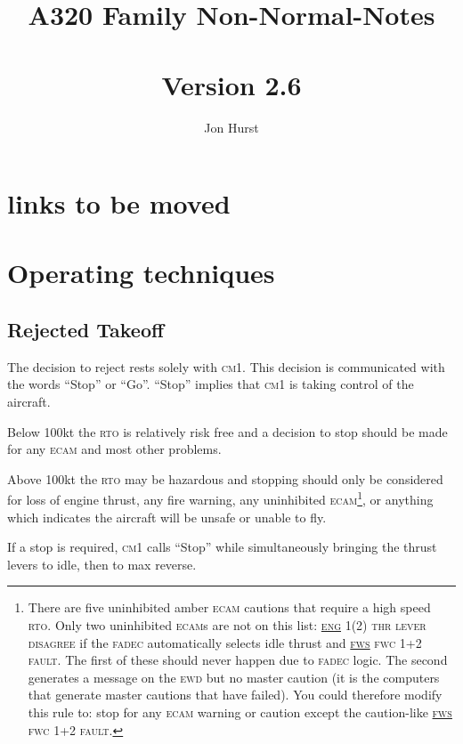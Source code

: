 \documentclass[a5paper,11pt,twoside]{book}
\title{A320 Family Non-Normal-Notes\\~\\\large{Version 2.6}}
\author{Jon Hurst}
\date{}
\newcommand{\ac}[1]{{\scshape\MakeLowercase{#1}}}
\newcommand{\ecam}[2]{{\ac{\uline{#1} #2}}}
\begin{document}
\frontmatter
\maketitle

\ifdefined\HCode
\else
\tableofcontents
\fi

\chapter{links to be moved}
\label{sec-loss-of-braking}
\label{sec-all-engine-failure}
\label{sec-gravity-fuel-feeding}
\label{sec-alternate-law}
\label{sec-nose-wheel-steering}

\mainmatter

\chapter{Operating techniques}
\section{Rejected Takeoff}
The decision to reject rests solely with \ac{CM}1. This decision is communicated
with the words ``Stop'' or “Go''. ``Stop'' implies that \ac{CM}1 is taking
control of the aircraft.

Below 100kt the \ac{RTO} is relatively risk free and a decision to stop should
be made for any \ac{ECAM} and most other problems.

Above 100kt the \ac{RTO} may be hazardous and stopping should only be considered
for loss of engine thrust, any fire warning, any uninhibited
\ac{ECAM}\footnote{There are five uninhibited amber \ac{ECAM} cautions that
require a high speed \ac{RTO}. Only two uninhibited \ac{ECAM}s are not on this
list: \ecam{ENG}{1(2) THR LEVER DISAGREE} if the \ac{FADEC} automatically
selects idle thrust and \ecam{FWS}{FWC 1+2 FAULT}. The first of these should
never happen due to \ac{FADEC} logic. The second generates a message on the
\ac{EWD} but no master caution (it is the computers that generate master
cautions that have failed). You could therefore modify this rule to: stop for
any \ac{ECAM} warning or caution except the caution-like \ecam{FWS}{FWC 1+2
  FAULT}.}, or anything which indicates the aircraft will be unsafe or unable to
fly.

If a stop is required, \ac{CM}1 calls ``Stop'' while simultaneously bringing the
thrust levers to idle, then to max reverse.
\end{document}
